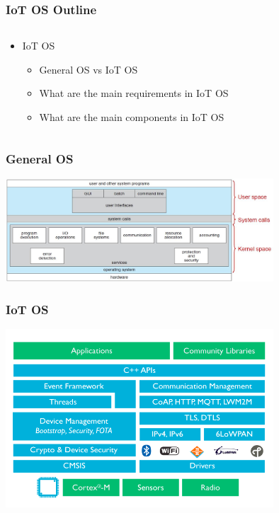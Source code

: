 \documentclass{beamer}
\begin{document}
\begin{frame}
	\frametitle{IoT OS Outline}
	\begin{columns}[c]
		\begin{column}{30cm}
			\vspace{.1cm}
			\begin{itemize}
				\justifying
				\item IoT OS
				\begin{itemize}
					\item General OS vs IoT OS
					\item What are the main requirements in IoT OS
					\item What are the main components in IoT OS
				\end{itemize}
			\end{itemize}
		\end{column}
	\end{columns}
\end{frame}

\begin{frame}
	\frametitle{General OS}
	\vspace{.5cm}
	\hspace*{1.5cm} \includegraphics[width=10cm]{figs/os-components.jpg}
\end{frame}

\begin{frame}
	\frametitle{IoT OS}
	\vspace{.5cm}
	\hspace*{1cm} \includegraphics[width=10cm]{figs/mbed-components.png}
\end{frame}
\end{document}
